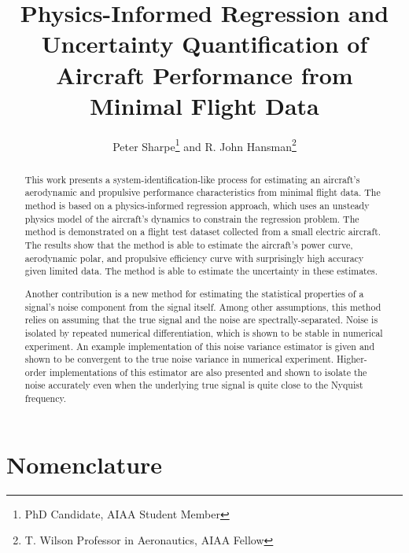 \documentclass[conf]{new-aiaa}
\title{Physics-Informed Regression and Uncertainty Quantification of Aircraft Performance from Minimal Flight Data}
\author{Peter Sharpe\footnote{PhD Candidate, AIAA Student Member} and R. John Hansman\footnote{T. Wilson Professor in Aeronautics, AIAA Fellow}}
\affil{Massachusetts Institute of Technology, Cambridge, MA}
\begin{document}
    \maketitle

    \begin{abstract}

        This work presents a system-identification-like process for estimating an aircraft's aerodynamic and propulsive performance characteristics from minimal flight data. The method is based on a physics-informed regression approach, which uses an unsteady physics model of the aircraft's dynamics to constrain the regression problem. The method is demonstrated on a flight test dataset collected from a small electric aircraft. The results show that the method is able to estimate the aircraft's power curve, aerodynamic polar, and propulsive efficiency curve with surprisingly high accuracy given limited data. The method is able to estimate the uncertainty in these estimates.

        Another contribution is a new method for estimating the statistical properties of a signal's noise component from the signal itself. Among other assumptions, this method relies on assuming that the true signal and the noise are spectrally-separated. Noise is isolated by repeated numerical differentiation, which is shown to be stable in numerical experiment. An example implementation of this noise variance estimator is given and shown to be convergent to the true noise variance in numerical experiment. Higher-order implementations of this estimator are also presented and shown to isolate the noise accurately even when the underlying true signal is quite close to the Nyquist frequency.

    \end{abstract}

    \section{Nomenclature}
\end{document}
